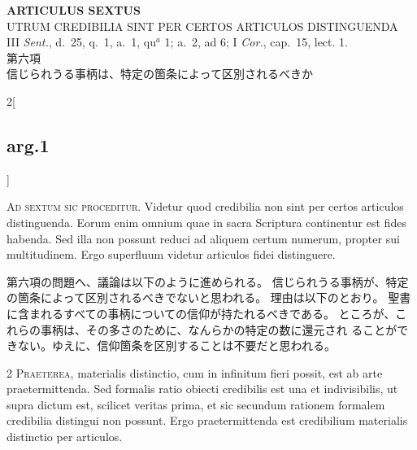 \documentclass[paper=a4paper,fontsize=10pt,jafontsize=9pt,titlepage]{jlreq}
\begin{document}
\newpage


{}
\setcounter{section}{6}
\setcounter{subsection}{0}
\begin{center}
 {\Large {\bfseries ARTICULUS SEXTUS}}\\
 {\large UTRUM CREDIBILIA SINT PER CERTOS ARTICULOS DISTINGUENDA}\\
 {\footnotesize III {\itshape Sent.}, d.~25, q.~1, a.~1, qu$^a$ 1; a.~2,
 ad 6; I {\itshape Cor.}, cap.~15, lect. 1.}\\
 {\Large 第六項\\信じられうる事柄は、特定の箇条によって区別されるべきか}
\end{center}

\begin{paracol}{2}[\subsection{arg.1}]

{\huge A}{\scshape d sextum sic proceditur}. Videtur quod
credibilia non sint per certos articulos distinguenda. Eorum enim omnium
quae in sacra Scriptura continentur est fides habenda. Sed illa non
possunt reduci ad aliquem certum numerum, propter sui multitudinem. Ergo
superfluum videtur articulos fidei distinguere.

\switchcolumn

第六項の問題へ、議論は以下のように進められる。
信じられうる事柄が、特定の箇条によって区別されるべきでないと思われる。
理由は以下のとおり。
聖書に含まれるすべての事柄についての信仰が持たれるべきである。
ところが、これらの事柄は、その多さのために、なんらかの特定の数に還元され
 ることができない。ゆえに、信仰箇条を区別することは不要だと思われる。


{\scshape 2 Praeterea}, materialis distinctio, cum
in infinitum fieri possit, est ab arte praetermittenda. Sed formalis
ratio obiecti credibilis est una et indivisibilis, ut supra dictum est,
scilicet veritas prima, et sic secundum rationem formalem credibilia
distingui non possunt. Ergo praetermittenda est credibilium materialis
distinctio per articulos.

\switchcolumn


\end{paracol}
\end{document}
